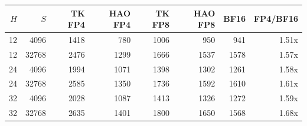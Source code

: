 \begin{tabular}{rrrrrrrr}
\toprule
$H$ & $S$ & TK FP4 & HAO FP4 & TK FP8 & HAO FP8 & BF16 & FP4/BF16 \\
\midrule
12 & 4096 & 1418 & 780 & 1006 & 950 & 941 & 1.51x \\
12 & 32768 & 2476 & 1299 & 1666 & 1537 & 1578 & 1.57x \\
24 & 4096 & 1994 & 1071 & 1398 & 1302 & 1261 & 1.58x \\
24 & 32768 & 2585 & 1350 & 1736 & 1592 & 1610 & 1.61x \\
32 & 4096 & 2028 & 1087 & 1413 & 1326 & 1272 & 1.59x \\
32 & 32768 & 2635 & 1401 & 1800 & 1650 & 1568 & 1.68x \\
\bottomrule
\end{tabular}
